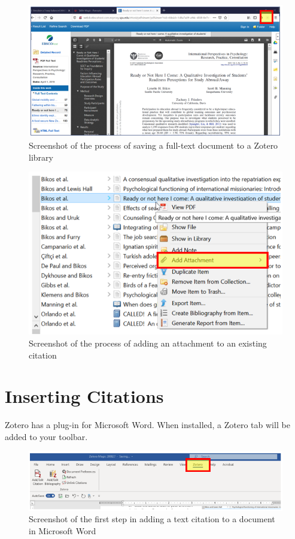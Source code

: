 \documentclass[
  english,
]{book}
\begin{document}
\begin{figure}
\centering
\includegraphics{images/Zotero/SavingFullText.png}
\caption{Screenshot of the process of saving a full-text document to a Zotero library}
\end{figure}

\begin{figure}
\centering
\includegraphics{images/Zotero/AddingAttachment.png}
\caption{Screenshot of the process of adding an attachment to an existing citation}
\end{figure}

\hypertarget{inserting-citations}{%
\section{Inserting Citations}\label{inserting-citations}}

Zotero has a plug-in for Microsoft Word. When installed, a Zotero tab will be added to your toolbar.

\begin{figure}
\centering
\includegraphics{images/Zotero/InsertingCitations.png}
\caption{Screenshot of the first step in adding a text citation to a document in Microsoft Word}
\end{figure}
\end{document}
